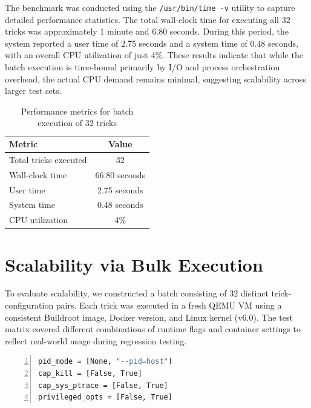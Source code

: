 \documentclass[12pt]{report}
\begin{document}
\begin{doublespace}
The benchmark was conducted using the \texttt{/usr/bin/time -v} utility to capture detailed performance statistics. The total wall-clock time for executing all 32 tricks was approximately 1 minute and 6.80 seconds. During this period, the system reported a user time of 2.75 seconds and a system time of 0.48 seconds, with an overall CPU utilization of just 4\%. These results indicate that while the batch execution is time-bound primarily by I/O and process orchestration overhead, the actual CPU demand remains minimal, suggesting scalability across larger test sets.

\begin{table}[ht]
\centering
\caption{Performance metrics for batch execution of 32 tricks}
\label{tab:batch-execution}
\begin{tabular}{|l|c|}
\hline
\textbf{Metric}         & \textbf{Value} \\
\hline
Total tricks executed   & 32 \\
Wall-clock time         & 66.80 seconds \\
User time               & 2.75 seconds \\
System time             & 0.48 seconds \\
CPU utilization         & 4\% \\
\hline
\end{tabular}
\end{table}



















\section{Scalability via Bulk Execution}

To evaluate scalability, we constructed a batch consisting of 32 distinct trick-configuration pairs. Each trick was executed in a fresh QEMU VM using a consistent Buildroot image, Docker version, and Linux kernel (v6.0). The test matrix covered different combinations of runtime flags and container settings to reflect real-world usage during regression testing.

\begin{lstlisting}[language=bash, caption={Trick Configuration Parameters}, label={lst:escape-trick}, numbers=left, numberstyle=\tiny, stepnumber=1, frame=single, breaklines=true, backgroundcolor=\color{gray!10}, basicstyle=\ttfamily\footnotesize, showspaces=false, showstringspaces=false]
pid_mode = [None, "--pid=host"]
cap_kill = [False, True]
cap_sys_ptrace = [False, True]
privileged_opts = [False, True]
\end{lstlisting}


\end{doublespace}
\end{document}
